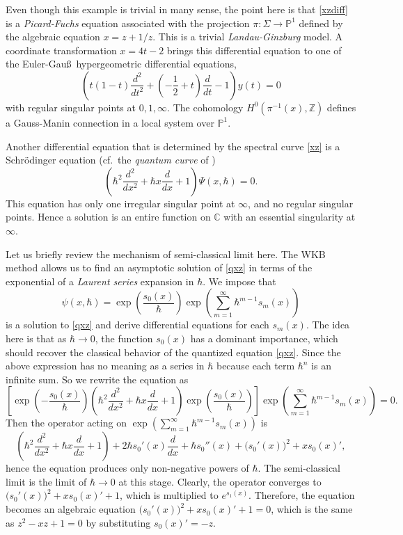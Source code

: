 \documentclass{amsart}
\theoremstyle{definition}
\numberwithin{equation}{section}
\numberwithin{figure}{section}
\newcommand{\be}{\begin{equation}}
\newcommand{\ee}{\end{equation}}
\newcommand{\bP}{{\mathbb{P}}}
\newcommand{\bC}{{\mathbb{C}}}
\newcommand{\bZ}{{\mathbb{Z}}}
\newcommand{\half}{{\frac{1}{2}}}
\newcommand{\rar}{\rightarrow}
\newcommand{\lrar}{\longrightarrow}
\begin{document}
Even though this example is trivial in many sense, the point here
is that \eqref{xzdiff} is a \emph{Picard-Fuchs} equation
associated with the projection $\pi: \Sigma\lrar \bP^1$ defined by 
the algebraic equation $x = z + 1/z$. This is a trivial 
\emph{Landau-Ginzburg} model. A coordinate transformation $x = 4t-2$ brings this differential equation to 
one of the Euler-Gau\ss\ 
hypergeometric differential equations,
\be
\label{hyper}
\left(t(1-t) \frac{d^2}{dt^2} + (-\half +t) \frac{d}{dt} -1
\right) y(t)=0
\ee
with regular singular points at $0, 1, \infty$. 
The cohomology $H^0(\pi^{-1}(x),\bZ)$
defines a Gauss-Manin connection in a local system over $\bP^1$.
  


Another differential equation that is determined by 
the spectral curve \eqref{xz} is 
a Schr\"odinger equation (cf.\ the \emph{quantum curve} of \cite{OM1, OM2})
\be
\label{qxz}
\left(\hbar^2 \frac{d^2}{dx^2} + \hbar x\frac{d}{dx}+  1\right)
\Psi(x,\hbar)
=0.
\ee
This equation has only one irregular singular point at 
$\infty$, and no regular singular points. Hence a solution is
an entire function on $\bC$ with an essential singularity at $\infty$.


Let us briefly review the mechanism of semi-classical limit here. The WKB method 
allows us to find an asymptotic solution of \eqref{qxz} 
in terms of the exponential of a  \emph{Laurent series} expansion in $\hbar$.
We impose that 
$$
\psi(x,\hbar) = \exp\left(\frac{s_0(x)}{\hbar}\right) 
\exp\left(\sum_{m=1}^\infty \hbar^{m-1}s_m(x)\right)
$$
is a solution to \eqref{qxz} and derive differential equations for each 
$s_m(x)$. The idea here is that as $\hbar\rar 0$, the function 
$s_0(x)$ has a dominant importance, which should recover the
classical behavior of the quantized equation \eqref{qxz}. 
Since the above expression has no meaning as a series in $\hbar$
because each term $\hbar^n$ is an infinite sum. So we rewrite
the equation as
$$
\left[\exp\left(-\frac{s_0(x)}{\hbar}\right) 
\left(\hbar^2 \frac{d^2}{dx^2} + \hbar x\frac{d}{dx}+  1\right)
\exp\left(\frac{s_0(x)}{\hbar}\right) \right] 
\exp\left(\sum_{m=1}^\infty \hbar^{m-1}s_m(x)\right)=0.
$$
Then the operator acting on $\exp\left(\sum_{m=1}^\infty \hbar^{m-1}s_m(x)\right)$
is 
$$
\left(\hbar^2 \frac{d^2}{dx^2} + \hbar x\frac{d}{dx}+  1\right)
+2\hbar s_0'(x) \frac{d}{dx}+\hbar s_0''(x)+ \big(s_0'(x)\big)^2
+xs_0(x)' ,
$$ 
hence the equation produces only non-negative powers of $\hbar$.
The semi-classical limit is the limit of $\hbar\rar 0$ at this stage. 
Clearly, the operator converges to $\big(s_0'(x)\big)^2
+xs_0(x)' + 1$, which is multiplied to $e^{s_1(x)}$. 
Therefore, the equation becomes an algebraic equation
$\big(s_0'(x)\big)^2
+xs_0(x)' + 1=0$, which is the same as $z^2-xz+1=0$ by
substituting $s_0(x)'=-z$. 
\end{document}
